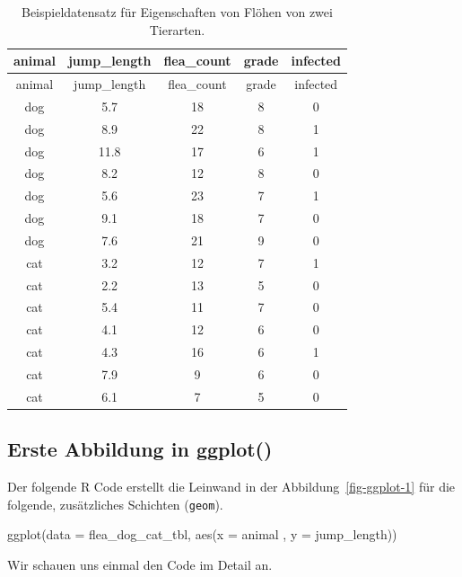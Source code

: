 \documentclass[
  letterpaper,
  DIV=11,
  oneside]{scrreport}
\newenvironment{Shaded}{\begin{snugshade}}{\end{snugshade}}
\newcommand{\AttributeTok}[1]{\textcolor[rgb]{0.40,0.45,0.13}{#1}}
\newcommand{\FunctionTok}[1]{\textcolor[rgb]{0.28,0.35,0.67}{#1}}
\newcommand{\NormalTok}[1]{\textcolor[rgb]{0.00,0.23,0.31}{#1}}
\begin{document}
\hypertarget{tbl-cat-dog-ggplot}{}
\begin{longtable}[]{@{}ccccc@{}}
\caption{\label{tbl-cat-dog-ggplot}Beispieldatensatz für Eigenschaften
von Flöhen von zwei Tierarten.}\tabularnewline
\toprule()
animal & jump\_length & flea\_count & grade & infected \\
\midrule()
\endfirsthead
\toprule()
animal & jump\_length & flea\_count & grade & infected \\
\midrule()
\endhead
dog & 5.7 & 18 & 8 & 0 \\
dog & 8.9 & 22 & 8 & 1 \\
dog & 11.8 & 17 & 6 & 1 \\
dog & 8.2 & 12 & 8 & 0 \\
dog & 5.6 & 23 & 7 & 1 \\
dog & 9.1 & 18 & 7 & 0 \\
dog & 7.6 & 21 & 9 & 0 \\
cat & 3.2 & 12 & 7 & 1 \\
cat & 2.2 & 13 & 5 & 0 \\
cat & 5.4 & 11 & 7 & 0 \\
cat & 4.1 & 12 & 6 & 0 \\
cat & 4.3 & 16 & 6 & 1 \\
cat & 7.9 & 9 & 6 & 0 \\
cat & 6.1 & 7 & 5 & 0 \\
\bottomrule()
\end{longtable}

\hypertarget{erste-abbildung-in-ggplot}{%
\subsection{Erste Abbildung in
ggplot()}\label{erste-abbildung-in-ggplot}}

Der folgende R Code erstellt die Leinwand in der
Abbildung~\ref{fig-ggplot-1} für die folgende, zusätzliches Schichten
(\texttt{geom}).

\begin{Shaded}
\begin{Highlighting}[]
\FunctionTok{ggplot}\NormalTok{(}\AttributeTok{data =}\NormalTok{ flea\_dog\_cat\_tbl, }
       \FunctionTok{aes}\NormalTok{(}\AttributeTok{x =}\NormalTok{ animal , }\AttributeTok{y =}\NormalTok{ jump\_length))}
\end{Highlighting}
\end{Shaded}

Wir schauen uns einmal den Code im Detail an.
\end{document}
